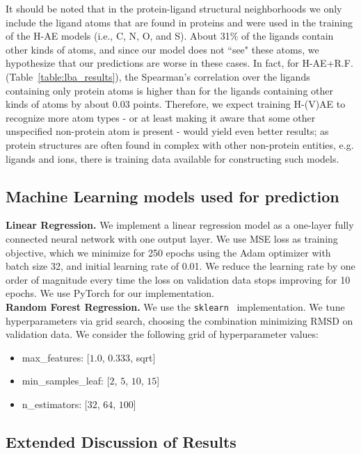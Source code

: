 It should be noted that in the protein-ligand structural neighborhoods we only include the ligand
atoms that are found in proteins and were used in the training of the H-AE models (i.e., C, N, O,
and S). About 31\% of the ligands contain other kinds of atoms, and since our model does not ``see"
these atoms, we hypothesize that our predictions are worse in these cases. In fact, for H-AE+R.F.
(Table~\ref{table:lba_results}), the Spearman's correlation over the ligands containing only
protein atoms is higher than for the ligands containing other kinds of atoms by about 0.03 points.
Therefore, we expect training H-(V)AE to recognize more atom types - or at  least making it aware
that some other unspecified non-protein atom is present - would yield even better results; as
protein structures are often found in complex with other non-protein entities, e.g. ligands and
ions, there is training data available for constructing such models.


\subsection{Machine Learning models used for prediction}
\noindent \textbf{Linear Regression.} We implement a linear regression model as a one-layer fully
connected neural network with one output layer. We use MSE loss as training objective, which we
minimize for 250 epochs using the Adam optimizer with batch size 32, and initial learning rate of
0.01. We reduce the learning rate by one order of magnitude every time the loss on validation data
stops improving for 10 epochs. We use PyTorch for our implementation.\\

\noindent \textbf{Random Forest Regression.} We use the
\texttt{sklearn}~\cite{pedregosa_scikit-learn_2011} implementation. We tune hyperparameters via
grid search, choosing the combination minimizing RMSD on validation data. We consider the following
grid of hyperparameter values:

\begin{itemize}
    \item max\_features: [$1.0$, $0.333$, sqrt]
    \item min\_samples\_leaf: [$2$, $5$, $10$, $15$]
    \item n\_estimators: [$32$, $64$, $100$]
\end{itemize}

\subsection{Extended Discussion of Results}


